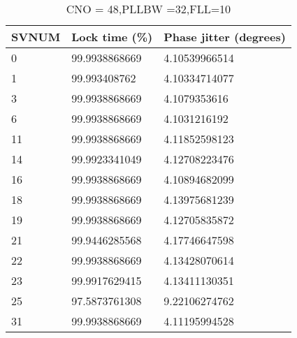 \begin{table}[!htb]
\centering
\begin{tabular}{|l|l|l|}
\hline
\rowcolor[HTML]{C0C0C0} 
SVNUM & Lock time (\%) & Phase jitter (degrees) \\ \hline
0     & 99.9938868669  & 4.10539966514          \\ \hline
\rowcolor[HTML]{EFEFEF} 
1     & 99.993408762   & 4.10334714077          \\ \hline
3     & 99.9938868669  & 4.1079353616           \\ \hline
\rowcolor[HTML]{EFEFEF} 
6     & 99.9938868669  & 4.1031216192           \\ \hline
11    & 99.9938868669  & 4.11852598123          \\ \hline
\rowcolor[HTML]{EFEFEF} 
14    & 99.9923341049  & 4.12708223476          \\ \hline
16    & 99.9938868669  & 4.10894682099          \\ \hline
\rowcolor[HTML]{EFEFEF} 
18    & 99.9938868669  & 4.13975681239          \\ \hline
19    & 99.9938868669  & 4.12705835872          \\ \hline
\rowcolor[HTML]{EFEFEF} 
21    & 99.9446285568  & 4.17746647598          \\ \hline
22    & 99.9938868669  & 4.13428070614          \\ \hline
\rowcolor[HTML]{EFEFEF} 
23    & 99.9917629415  & 4.13411130351          \\ \hline
25    & 97.5873761308  & 9.22106274762          \\ \hline
\rowcolor[HTML]{EFEFEF} 
31    & 99.9938868669  & 4.11195994528          \\ \hline
\end{tabular}
\caption{CNO = 48,PLLBW =32,FLL=10}
\label{my-label}
\end{table}




